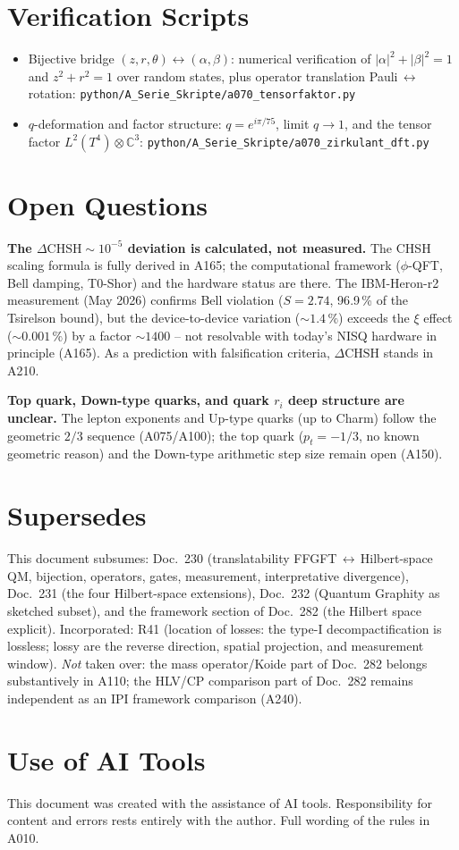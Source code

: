 \section{Verification Scripts}

\begin{itemize}[leftmargin=2em,itemsep=2pt,topsep=2pt]
  \item Bijective bridge $(z,r,\theta)\leftrightarrow(\alpha,\beta)$: numerical
    verification of $|\alpha|^2+|\beta|^2=1$ and $z^2+r^2=1$ over random states,
    plus operator translation Pauli$\,\leftrightarrow\,$rotation:
    \texttt{python/A\_Serie\_Skripte/a070\_tensorfaktor.py}
  \item $q$-deformation and factor structure: $q = e^{i\pi/75}$, limit $q\to1$,
    and the tensor factor $L^2(T^4)\otimes\mathbb{C}^3$:
    \texttt{python/A\_Serie\_Skripte/a070\_zirkulant\_dft.py}
\end{itemize}

\section{Open Questions}

\textbf{The $\Delta\text{CHSH}\sim10^{-5}$ deviation is calculated, not measured.}
The CHSH scaling formula is fully derived in A165; the computational framework
($\phi$-QFT, Bell damping, T0-Shor) and the hardware status are there. The
IBM-Heron-r2 measurement (May 2026) confirms Bell violation ($S=2{.}74$, 96{.}9\,\%
of the Tsirelson bound), but the device-to-device variation ($\sim1{.}4\,\%$)
exceeds the $\xi$ effect ($\sim0{.}001\,\%$) by a factor $\sim1400$ -- not
resolvable with today's NISQ hardware in principle (A165). As a prediction with
falsification criteria, $\Delta\text{CHSH}$ stands in A210.

\textbf{Top quark, Down-type quarks, and quark $r_i$ deep structure are unclear.}
The lepton exponents and Up-type quarks (up to Charm) follow the geometric $2/3$
sequence (A075/A100); the top quark ($p_t=-1/3$, no known geometric reason) and
the Down-type arithmetic step size remain open (A150).

\section{Supersedes}

This document subsumes: Doc.~230 (translatability FFGFT$\,\leftrightarrow\,$Hilbert-space
QM, bijection, operators, gates, measurement, interpretative divergence), Doc.~231
(the four Hilbert-space extensions), Doc.~232 (Quantum Graphity as sketched subset),
and the framework section of Doc.~282 (the Hilbert space explicit). Incorporated:
R41 (location of losses: the type-I decompactification is lossless; lossy are
the reverse direction, spatial projection, and measurement window). \emph{Not}
taken over: the mass operator/Koide part of Doc.~282 belongs substantively in
A110; the HLV/CP comparison part of Doc.~282 remains independent as an IPI
framework comparison (A240).

\section{Use of AI Tools}

This document was created with the assistance of AI tools.
Responsibility for content and errors rests entirely with the author.
Full wording of the rules in A010.
